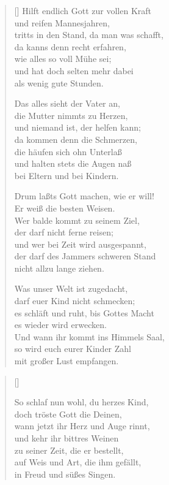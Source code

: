 \begin{multicols}{2}
\begin{verse}[\versewidth]
 Hilft endlich Gott zur vollen Kraft\\
und reifen Mannesjahren,\\
tritts in den Stand, da man was schafft,\\
da kanns denn recht erfahren,\\
wie alles so voll Mühe sei;\\
und hat doch selten mehr dabei\\
als wenig gute Stunden.

 Das alles sieht der Vater an,\\
die Mutter nimmts zu Herzen,\\
und niemand ist, der helfen kann;\\
da kommen denn die Schmerzen,\\
die häufen sich ohn Unterlaß\\
und halten stets die Augen naß\\
bei Eltern und bei Kindern.

 Drum laßts Gott machen, wie er will!\\
Er weiß die besten Weisen.\\
Wer balde kommt zu seinem Ziel,\\
der darf nicht ferne reisen;\\
und wer bei Zeit wird ausgespannt,\\
der darf des Jammers schweren Stand\\
nicht allzu lange ziehen.

 Was unser Welt ist zugedacht,\\
darf euer Kind nicht schmecken;\\
es schläft und ruht, bis Gottes Macht\\
es wieder wird erwecken.\\
Und wann ihr kommt ins Himmels Saal,\\
so wird euch eurer Kinder Zahl\\
mit großer Lust empfangen.
\end{verse}
\end{multicols}

\begin{center}
\settowidth{\versewidth}{Der, vor dem die Welt erschrickt,}
\begin{verse}[\versewidth]


 So schlaf nun wohl, du herzes Kind,\\
doch tröste Gott die Deinen,\\
wann jetzt ihr Herz und Auge rinnt,\\
und kehr ihr bittres Weinen\\
zu seiner Zeit, die er bestellt,\\
auf Weis und Art, die ihm gefällt,\\
in Freud und süßes Singen.

  
\end{verse}
\end{center}

